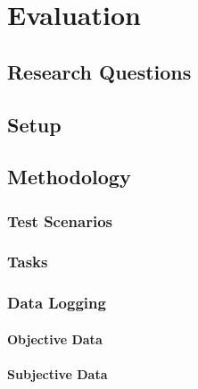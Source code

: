 \chapter{Evaluation}\label{chap:eval}

\section{Research Questions}

\section{Setup}

\section{Methodology}

    \subsection{Test Scenarios}

    \subsection{Tasks}

    \subsection{Data Logging}

        \subsubsection{Objective Data}

        \subsubsection{Subjective Data}

